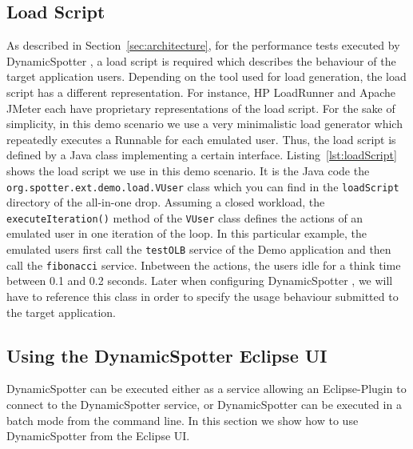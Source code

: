 \documentclass{report}
\newcommand{\DS}{DynamicSpotter }
\begin{document}
\subsection{Load Script}
\label{sec:loadScript}
As described in Section~\ref{sec:architecture}, for the performance tests executed by \DS, a load script is required
which describes the behaviour of the target application users. Depending on the tool used for load generation, the load
script has a different representation. For instance, HP LoadRunner and Apache JMeter each have proprietary
representations of the load script.
For the sake of simplicity, in this demo scenario we use a very minimalistic load
generator which repeatedly executes a Runnable for each emulated user. Thus, the load script is defined by a Java class
implementing a certain interface. Listing~\ref{lst:loadScript} shows the load script we use in this demo scenario. It is
the Java code the \texttt{org.spotter.ext.demo.load.VUser} class which you can find in the \texttt{loadScript} directory
of the all-in-one drop. 
Assuming a closed workload, the \texttt{executeIteration()} method of the \texttt{VUser} class defines the actions of an
emulated user in one iteration of the loop. In this particular example, the emulated users first call the
\texttt{testOLB} service of the Demo application and then call the \texttt{fibonacci} service. Inbetween the actions,
the users idle for a think time between 0.1 and 0.2 seconds.
Later when configuring \DS, we will have to reference this class in order to specify the usage behaviour submitted to
the target application.







\subsection{Using the \DS Eclipse UI}
\label{sec:usingEclipseUI}
\DS can be executed either as a service allowing an  Eclipse-Plugin  to connect to the \DS service, or \DS can be executed in
a batch mode from the command line. In this section we show how to use \DS from the Eclipse UI.
\end{document}
